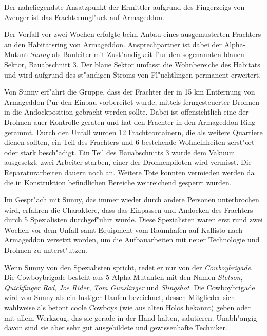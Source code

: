 
Der naheliegendste Ansatzpunkt der Ermittler aufgrund des Fingerzeigs von Avenger ist das Frachterungl"uck auf Armageddon.

Der Vorfall vor zwei Wochen erfolgte beim Anbau eines ausgemusterten Frachters an den Habitatsring von Armageddon. Ansprechpartner ist dabei der Alpha-Mutant \emph{Sunny} als Bauleiter mit Zust"andigkeit f"ur den sogenannten blauen Sektor, Bauabschnitt 3. Der blaue Sektor umfasst die Wohnbereiche des Habitats und wird aufgrund des st"andigen Stroms von Fl"uchtlingen permanent erweitert.

Von Sunny erf"ahrt die Gruppe, dass der Frachter der in 15 km Entfernung von Armageddon f"ur den Einbau vorbereitet wurde, mittels ferngesteuerter Drohnen in die Andockposition gebracht werden sollte. Dabei ist offensichtlich eine der Drohnen au\3er Kontrolle geraten und hat den Frachter in den Armageddon Ring gerammt. Durch den Unfall wurden 12 Frachtcontainern, die als weitere Quartiere dienen sollten, ein Teil des Frachters und 6 bestehende Wohneinheiten zerst"ort oder stark besch"adigt. Ein Teil des Bauabschnitts 3 wurde dem Vakuum ausgesetzt, zwei Arbeiter starben, einer der Drohnenpiloten wird vermisst. Die Reparaturarbeiten dauern noch an. Weitere Tote konnten vermieden werden da die in Konstruktion befindlichen Bereiche weitreichend gesperrt wurden.

Im Gespr"ach mit Sunny, das immer wieder durch andere Personen unterbrochen wird, erfahren die Charaktere, dass das Einpassen und Andocken des Frachters durch 5 Spezialisten durchgef"uhrt wurde. Diese Spezialisten waren erst rund zwei Wochen vor dem Unfall samt Equipment vom  Raumhafen auf Kallisto nach Armageddon versetzt worden, um die Aufbauarbeiten mit neuer Technologie und Drohnen zu unterst"utzen.

Wenn Sunny von den Spezialisten spricht, redet er nur von der \emph{Cowboybrigade}. Die Cowboybrigade besteht aus 5 Alpha-Mutanten mit den Namen \emph{Stetson}, \emph{Quickfinger Rod}, \emph{Joe Rider}, \emph{Tom Gunslinger} und \emph{Slingshot}. Die Cowboybrigade wird von Sunny als ein lustiger Haufen bezeichnet, dessen Mitglieder sich wahlweise als betont coole Cowboys (wie aus alten Holos bekannt) geben oder mit allem Werkzeug, das sie gerade in der Hand halten, salutieren. Unabh"angig davon sind sie aber sehr gut ausgebildete und gewissenhafte Techniker.

